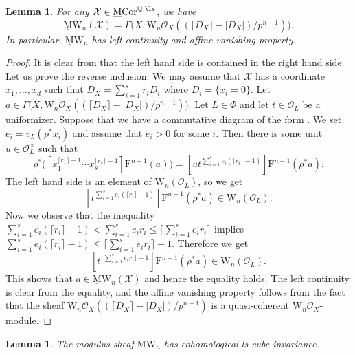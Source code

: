 \documentclass{amsart}
\theoremstyle{plain}
\newtheorem{lemma}[theorem]{Lemma}
\theoremstyle{definition}
\theoremstyle{remark}
\numberwithin{equation}{section}
\def\ceil#1{\lceil #1 \rceil}
\def\MCor{\mathrm{\underline{M}Cor}}
\def\MW{\underline{\mathrm{M}}\mathrm{W}}
\begin{document}
\begin{lemma}\label{Witt_log_formula}
	For any $\mathcal{X}\in \MCor^{\mathbb{Q},\ls}$, we have
	$$
		\MW_n(\mathcal{X})=\Gamma\bigl(X,\mathrm{W}_n\mathcal{O}_X((\ceil{D_X}-|D_X|)/p^{n-1})\bigr).
	$$
	In particular, $\MW_n$ has left continuity and affine vanishing property.
\end{lemma}

\begin{proof}
	It is clear from  that the left hand side is contained in the right hand side.
	Let us prove the reverse inclusion.
	We may assume that $\mathcal{X}$ has a coordinate $x_1,\dots,x_d$ such that $D_X=\sum_{i=1}^s r_i D_i$ where $D_i=\{x_i=0\}$.
	Let $a\in \Gamma\bigl(X,\mathrm{W}_n\mathcal{O}_X((\ceil{D_X}-|D_X|)/p^{n-1})\bigr)$.
	Let $L\in \Phi$ and let $t\in \mathcal{O}_L$ be a uniformizer.
	Suppose that we have a commutative diagram of the form .
	We set $e_i=v_L(\rho^*x_i)$ and assume that $e_i>0$ for some $i$.
	Then there is some unit $u\in \mathcal{O}_L^\times$ such that
	$$
		\rho^*\bigl([x_1^{\ceil{r_1}-1}\cdots x_s^{\ceil{r_s}-1}]\mathrm{F}^{n-1}(a)\bigr)
            =
            [u t^{\sum_{i=1}^s e_i(\ceil{r_i}-1)}]\mathrm{F}^{n-1}(\rho^*a).
        $$
        The left hand side is an element of
        $\mathrm{W}_n(\mathcal{O}_L)$, so we get
        $$
            [t^{\sum_{i=1}^s e_i (\ceil{r_i}-1)}]\mathrm{F}^{n-1}(\rho^*a) \in \mathrm{W}_n(\mathcal{O}_L).
        $$
	Now we observe that the inequality $\sum_{i=1}^s e_i(\ceil{r_i}-1)<\sum_{i=1}^s e_i r_i\leq \ceil{\sum_{i=1}^s e_i r_i}$ implies $\sum_{i=1}^s e_i(\ceil{r_i}-1)\leq \ceil{\sum_{i=1}^s e_i r_i}-1$.
        Therefore we get
	$$
		[t^{\ceil{\sum_{i=1}^s e_i r_i}-1}]\mathrm{F}^{n-1}(\rho^*a) \in \mathrm{W}_n(\mathcal{O}_L).
	$$
    This shows that $a\in \MW_n(\mathcal{X})$ and hence the equality holds.
    The left continuity is clear from the equality, and the affine vanishing property follows from the fact that the sheaf $\mathrm{W}_n\mathcal{O}_X((\ceil{D_X}-|D_X|)/p^{n-1})$ is a quasi-coherent $\mathrm{W}_n\mathcal{O}_X$-module.
\end{proof}

\begin{lemma}\label{Witt_CCI}
	The modulus sheaf $\MW_n$ has cohomological ls cube invariance.
\end{lemma}
\end{document}
